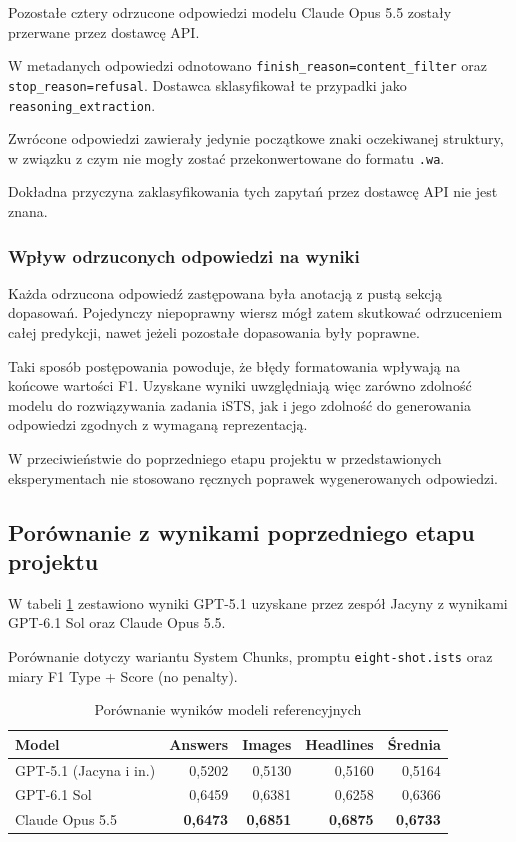 \documentclass[a4paper,10pt]{article}
\begin{document}
Pozostałe cztery odrzucone odpowiedzi modelu Claude
Opus 5.5 zostały przerwane przez dostawcę API.

W metadanych odpowiedzi odnotowano
\texttt{finish\_reason=content\_filter} oraz
\texttt{stop\_reason=refusal}. Dostawca sklasyfikował
te przypadki jako \texttt{reasoning\_extraction}.

Zwrócone odpowiedzi zawierały jedynie początkowe
znaki oczekiwanej struktury, w związku z czym
nie mogły zostać przekonwertowane do formatu
\texttt{.wa}.

Dokładna przyczyna zaklasyfikowania tych zapytań
przez dostawcę API nie jest znana.


\subsubsection{Wpływ odrzuconych odpowiedzi na wyniki}

Każda odrzucona odpowiedź zastępowana była anotacją
z pustą sekcją dopasowań. Pojedynczy niepoprawny
wiersz mógł zatem skutkować odrzuceniem całej predykcji,
nawet jeżeli pozostałe dopasowania były poprawne.

Taki sposób postępowania powoduje, że błędy
formatowania wpływają na końcowe wartości F1.
Uzyskane wyniki uwzględniają więc zarówno zdolność
modelu do rozwiązywania zadania iSTS, jak i jego
zdolność do generowania odpowiedzi zgodnych
z wymaganą reprezentacją.

W przeciwieństwie do poprzedniego etapu projektu
w przedstawionych eksperymentach nie stosowano
ręcznych poprawek wygenerowanych odpowiedzi.


\subsection{Porównanie z wynikami poprzedniego etapu projektu}

W tabeli \ref{tab:previous_comparison} zestawiono
wyniki GPT-5.1 uzyskane przez zespół Jacyny
z wynikami GPT-6.1 Sol oraz Claude Opus 5.5.

Porównanie dotyczy wariantu System Chunks,
promptu \texttt{eight-shot.ists} oraz miary
F1 Type + Score (no penalty).

\begin{table}[htbp]
    \centering
    \caption{Porównanie wyników modeli referencyjnych}
    \label{tab:previous_comparison}
    \begin{tabular}{lrrrr}
        \toprule
        Model
        & Answers
        & Images
        & Headlines
        & Średnia \\
        \midrule
        GPT-5.1 (Jacyna i in.)
            & 0,5202 & 0,5130 & 0,5160 & 0,5164 \\
        GPT-6.1 Sol
            & 0,6459 & 0,6381 & 0,6258 & 0,6366 \\
        Claude Opus 5.5
            & \textbf{0,6473}
            & \textbf{0,6851}
            & \textbf{0,6875}
            & \textbf{0,6733} \\
        \bottomrule
    \end{tabular}
\end{table}
\end{document}
